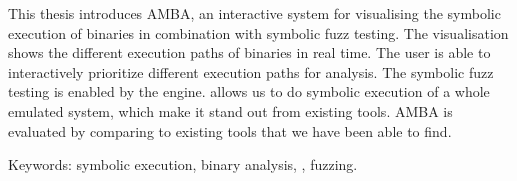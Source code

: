 This thesis introduces AMBA, an interactive system for visualising the symbolic execution of binaries in combination with symbolic fuzz testing.
The visualisation shows the different execution paths of binaries in real time.
The user is able to interactively prioritize different execution paths for analysis.
The symbolic fuzz testing is enabled by the \stoe{} engine.
\stoe{} allows us to do symbolic execution of a whole emulated system, which make it stand out from existing tools.
AMBA is evaluated by comparing to existing tools that we have been able to find.

Keywords: symbolic execution, binary analysis, \stoe{}, fuzzing.
